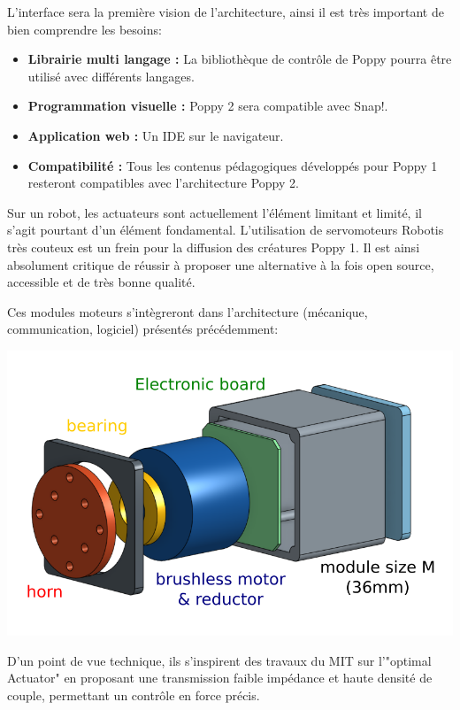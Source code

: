 \documentclass[a0,final, portrait]{inriaposter}
\begin{document}
\begin{multicols}{2}
{}

 {

L'interface sera la première vision de l'architecture, ainsi il est très important de bien comprendre les besoins:
\begin{itemize}
    \item \textbf{Librairie multi langage :} La bibliothèque de contrôle de Poppy pourra être utilisé avec différents langages.
    \item \textbf{Programmation visuelle :} Poppy 2 sera compatible avec Snap!.
    \item \textbf{Application web :} Un IDE sur le navigateur.
    \item \textbf{Compatibilité :} Tous les contenus pédagogiques développés pour Poppy 1 resteront compatibles avec l'architecture Poppy 2.
\end{itemize}
}


 {

Sur un robot, les actuateurs sont actuellement l'élément limitant et limité, il s'agit pourtant d'un élément fondamental. L'utilisation de servomoteurs Robotis très couteux est un frein pour la diffusion des créatures Poppy 1. Il est ainsi absolument critique de réussir à proposer une alternative à la fois open source, accessible et de très bonne qualité.

Ces modules moteurs s'intègreront dans l'architecture (mécanique, communication, logiciel) présentés précédemment:

\begin{center}
        \includegraphics[width=0.75\columnwidth]{images/module_moteur.png}
\end{center}

D'un point de vue technique, ils s'inspirent des travaux du MIT sur l'"optimal Actuator" en proposant une transmission faible impédance et haute densité de couple, permettant un contrôle en force précis.

}
\end{multicols}
\end{document}
